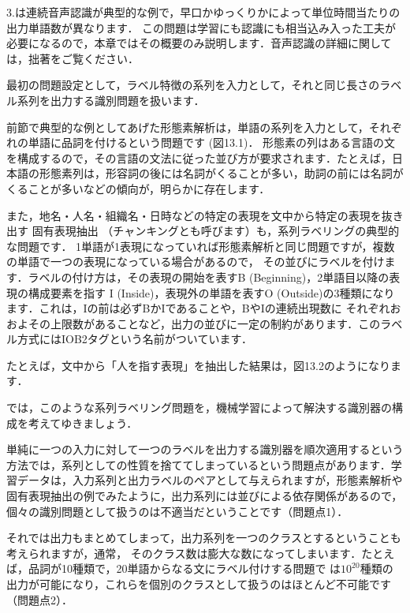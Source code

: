 3.は連続音声認識が典型的な例で，早口かゆっくりかによって単位時間当たりの出力単語数が異なります．
この問題は学習にも認識にも相当込み入った工夫が必要になるので，本章ではその概要のみ説明します．音声認識の詳細に関しては，拙著\cite{araki15}をご覧ください．


最初の問題設定として，ラベル特徴の系列を入力として，それと同じ長さのラベル系列を出力する識別問題を扱います．


前節で典型的な例としてあげた形態素解析は，単語の系列を入力として，それぞれの単語に品詞を付けるという問題です
(図13.1)．
形態素の列はある言語の文を構成するので，その言語の文法に従った並び方が要求されます．たとえば，日本語の形態素列は，形容詞の後には名詞がくることが多い，助詞の前には名詞がくることが多いなどの傾向が，明らかに存在します．

また，地名・人名・組織名・日時などの特定の表現を文中から特定の表現を抜き出す
固有表現抽出
（チャンキングとも呼びます）も，系列ラベリングの典型的な問題です．
1単語が1表現になっていれば形態素解析と同じ問題ですが，複数の単語で一つの表現になっている場合があるので，
その並びにラベルを付けます．ラベルの付け方は，その表現の開始を表すB (Beginning)，2単語目以降の表現の構成要素を指す
I (Inside)，表現外の単語を表すO (Outside)の3種類になります．これは，Iの前は必ずBかIであることや，BやIの連続出現数に
それぞれおおよその上限数があることなど，出力の並びに一定の制約があります．このラベル方式にはIOB2タグという名前がついています．

たとえば，文中から「人を指す表現」を抽出した結果は，図13.2のようになります．  


では，このような系列ラベリング問題を，機械学習によって解決する識別器の構成を考えてゆきましょう．

単純に一つの入力に対して一つのラベルを出力する識別器を順次適用するという方法では，系列としての性質を捨ててしまっているという問題点があります．学習データは，入力系列と出力ラベルのペアとして与えられますが，形態素解析や固有表現抽出の例でみたように，出力系列には並びによる依存関係があるので，個々の識別問題として扱うのは不適当だということです（問題点1）．

それでは出力もまとめてしまって，出力系列を一つのクラスとするということも考えられますが，通常，
そのクラス数は膨大な数になってしまいます．たとえば，品詞が10種類で，20単語からなる文にラベル付けする問題で
は$10^{20}$種類の出力が可能になり，これらを個別のクラスとして扱うのはほとんど不可能です（問題点2）．

